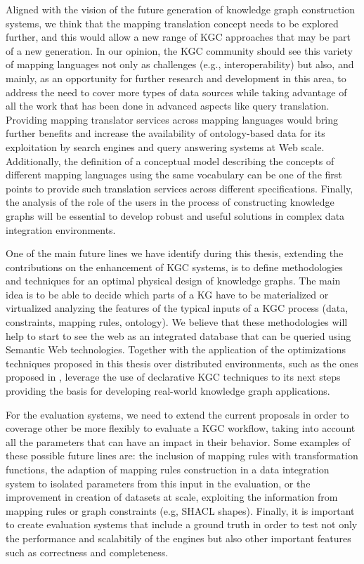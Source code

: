 Aligned with the vision of the future generation of knowledge graph construction systems, we think that the mapping translation concept needs to be explored further, and this would allow a new range of KGC approaches that may be part of a new generation. In our opinion, the KGC community should see this variety of mapping languages not only as challenges (e.g., interoperability) but also, and mainly, as an opportunity for further research and development in this area, to address the need to cover more types of data sources while taking advantage of all the work that has been done in advanced aspects like query translation. Providing mapping translator services across mapping languages would bring further benefits and increase the availability of ontology-based data for its exploitation by search engines and query answering systems at Web scale. Additionally, the definition of a conceptual model describing the concepts of different mapping languages using the same vocabulary can be one of the first points to provide such translation services across different specifications. Finally, the analysis of the role of the users in the process of constructing knowledge graphs will be essential to develop robust and useful solutions in complex data integration environments.

One of the main future lines we have identify during this thesis, extending the contributions on the enhancement of KGC systems, is to define methodologies and techniques for an optimal physical design of knowledge graphs. The main idea is to be able to decide which parts of a KG have to be materialized or virtualized analyzing the features of the typical inputs of a KGC process (data, constraints, mapping rules, ontology). We believe that these methodologies will help to start to see the web as an integrated database that can be queried using Semantic Web technologies. Together with the application of the optimizations techniques proposed in this thesis over distributed environments, such as the ones proposed in \citep{endris2019ontario,mami2019squerall}, leverage the use of declarative KGC techniques to its next steps providing the basis for developing real-world knowledge graph applications.

For the evaluation systems, we need to extend the current proposals in order to coverage other be more flexibly to evaluate a KGC workflow, taking into account all the parameters that can have an impact in their behavior. Some examples of these possible future lines are: the inclusion of mapping rules with transformation functions, the adaption of mapping rules construction in a data integration system to isolated parameters from this input in the evaluation, or the improvement in creation of datasets at scale, exploiting the information from mapping rules or graph constraints (e.g, SHACL shapes). Finally, it is important to create evaluation systems that include a ground truth in order to test not only the performance and scalabitily of the engines but also other important features such as correctness and completeness.

